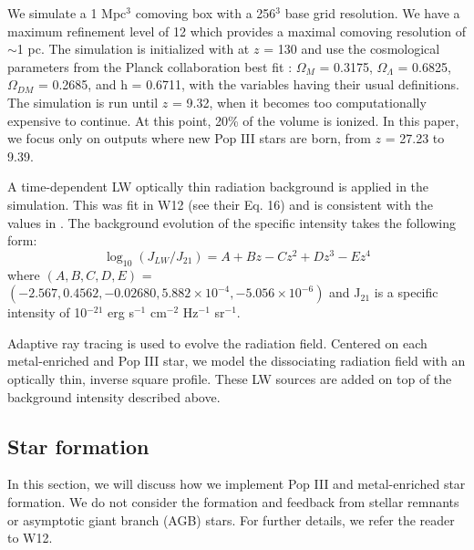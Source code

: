 \documentclass[a4paper,fleqn,usenatbib]{mnras}
\begin{document}
We simulate a 1 Mpc$^{3}$ comoving box with a 256$^{3}$ base grid 
resolution. We have a maximum refinement level of 12 which provides a maximal comoving resolution of $\sim$1 pc. The simulation is 
initialized with \music{} \citep{Hahn11_MUSIC} at $z$ = 130 and use the cosmological parameters from the Planck collaboration best fit 
\citet{Planck13_Cosmo}: $\Omega_{M}$ = 0.3175, $\Omega_{\Lambda}$ = 
0.6825, $\Omega_{DM}$ = 0.2685, and h = 0.6711, with the variables 
having their usual definitions. The simulation is run until $z$ = 9.32, when it becomes too computationally expensive to continue. At this point, 20\% of the volume is ionized. In this paper, we focus only on outputs where new Pop III stars are born, from $z$ = 27.23 to 9.39. 

A time-dependent LW optically thin radiation background is applied in the simulation. This was fit in W12 (see their Eq. 16) and is consistent with the values in \citet{Trenti09_SFR}. The background evolution of the specific intensity takes the following form:
\begin{equation} \label{LWbg}
	\log_{10}(J_{LW}/J_{21}) = A + Bz - Cz^{2} + Dz^{3} - Ez^{4}
\end{equation}
where $(A, B, C, D, E)$ = $(-2.567, 0.4562, - 0.02680, 5.882 \times 10^{-4}, - 5.056 \times 10^{-6})$ and J$_{21}$ is a specific intensity of 10$^{-21}$ erg s$^{-1}$ cm$^{-2}$ Hz$^{-1}$ sr$^{-1}$. 

Adaptive ray tracing \citep{Abel02_RT, Wise11_Moray} is used to evolve the radiation field. Centered on each metal-enriched and Pop III star, we model the \hh{} dissociating radiation field with an optically thin, inverse square profile. These LW sources are added on top of the background intensity described above.
\subsection{Star formation}
In this section, we will discuss how we implement Pop III and metal-enriched star formation. We do not consider the formation and feedback from stellar remnants or asymptotic giant branch (AGB) stars. For further details, we refer the reader to W12. 

\end{document}
